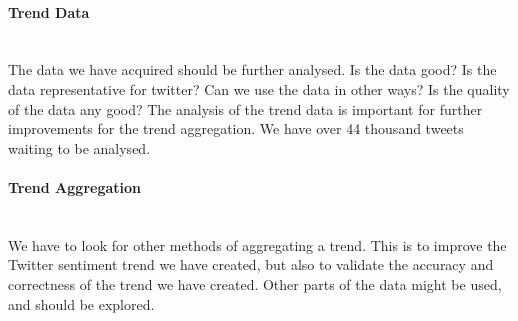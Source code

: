 \paragraph{Trend Data}
\hspace{0pt}\\
The data we have acquired should be further analysed. Is the data good? Is the
data representative for twitter? Can we use the data in other ways? Is the
quality of the data any good?  The analysis of the trend data is important for
further improvements for the trend aggregation. We have over 44 thousand tweets
waiting to be analysed. 

\paragraph{Trend Aggregation}
\hspace{0pt}\\
We have to look for other methods of aggregating a trend. This is to improve the
Twitter sentiment trend we have created, but also to validate the accuracy and
correctness of the trend we have created. Other parts of the data might
be used, and should be explored.  
%
